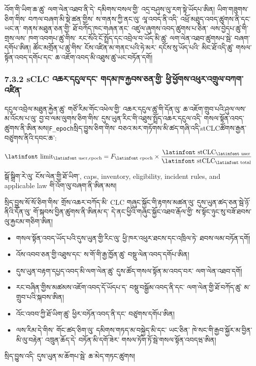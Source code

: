 \documentclass[11pt]{article}
\begin{document}
འོག་གི་ཡིག་ཆ་ཚུ་ ལག་ལེན་འཐབ་ནི་དེ་ དམིགས་བསལ་གྱི་ འདྲ་བཤུས་ལུ་རག་སྟེ་ཡོདཔ་ཨིན། ཡིག་གཟུགས་ཅིག་གིས་ བཀལ་བཞག་མི་སྡེ་ཚན་གྱིས་ ས་གནས་ཀྱི་ནང་ལུ་ ལཱ་འབད་ནི་འདི་ འཕྲོ་མཐུད་འབད་ཚུགས་ནི་དང་ ཡང་ན་ གནས་མཐུན་ཅན་གྱི་ ཐོ་བཀོད་ཁང་གཞན་ནང་ འཛུལ་ཞུགས་འབད་ཚུགས་པ་ཅིན་ ལས་བྱེདཔ་ཚུ་གི་གྲས་ལས་ ཁག་འབགཔ་ཚུ་གིས་ རང་སོའི་ངོ་སྤྲོད་དང་འབྲེལ་བ་ཡོད་མི་ཚུ་ ལག་ལེན་འཐབ་ཚུགསཔ་སྦེ་ བཞག་དགོཔ་ཨིན། ཚོང་མགྲོན་པ་ཚུ་གིས་ ངོས་འཛིན་མ་གནང་པའི་ཧེ་མར་ དངོས་སུ་ཡོད་པའི་ མིང་ཐོ་འདི་ཚུ་ གསལ་སྟོན་འབད་དགོཔ་དང་ ཆ་འཇོག་འབད་མི་འཐུས་ཚུ་ཡང་བཏོན་དགོ།

\subsubsection*{7.3.2 sCLC འཆར་དངུལ་དང་ གདམ་ཁ་རྐྱབས་ཅན་གྱི་ ཕྱི་ཕྱོགས་འཕུར་འགྲུལ་བཀག་འཛིན་}

དངུལ་འབྲེལ་མཐུན་རྐྱེན་ཚུ་ གཙོ་རིམ་གོང་འཕེལ་གྱི་ འཆར་དངུལ་ཚུ་གི་དོན་ལུ་ ཆ་འཇོག་གྲུབ་པའི་ཤུལ་ལས་ མ་འོངས་པ་ལུ་ བྱ་བ་ལམ་ལུགས་ཅིག་གིས་ དུས་ཡུན་རིང་གི་འཐུས་སྤྲོད་འཆར་དངུལ་འདི་ གསལ་སྟོན་འབད་ཚུགས་ནི་ཨིན་མས།\texttt{F\_epoch}སྲིད་བྱུས་ཅིག་གིས་ བཅའ་མར་གཏོགས་མི་ཚད་གཞི་འདི་stCLCཚོགས་རྒྱན་བཙུགས་ནིའི་དབང་ཆ་:

\[
\text{\latinfont limit}_{\text{\latinfont user,epoch}} = F_{\text{\latinfont epoch}} \times \frac{\text{\latinfont stCLC}_{\text{\latinfont user}}}{\text{\latinfont stCLC}_{\text{\latinfont total}}}
\]

སྒོ་སྒྲིག་རེ་ལུ་ ངོས་ལེན་གྱི་ཐོ་ཡིག་, caps, inventory, eligibility, incident rules, and applicable law གི་འོག་ལུ་བཞག་ནི་ཨིན་མས།

སྲིད་བྱུས་སོ་སོ་ཅིག་གིས་ གྲོས་འཆར་བཀོད་མི་ CLC གཞུང་སྐྱོང་གི་རྟགས་མཚན་ལུ་ དུས་ཡུན་ཚད་ཅན་སྦེ་ཉོ་ནིའི་དོན་ལུ་ གོ་སྐབས་བྱིན་ཚུགས་ནི་ཨིནམ་ད་ དེ་ནང་ཕྱིའི་གཞུང་སྐྱོང་འཐབ་རྒོལ་གྱི་ ས་སྟོང་ཉུང་སུ་བཟོ་ཐབས་ལུ་རྐྱངམ་གཅིག་ཨིན།

\begin{itemize}[leftmargin=*]
\item གསལ་སྟོན་འབད་ཡོད་པའི་དུས་ཡུན་གྱི་རིང་ལུ་ ཕྱི་ཁར་འཕུར་ཐངས་དང་འཁྲིལ་ཏེ་ ཐབས་ལམ་བཏོན་དགོ།
\item འོས་འབབ་ཅན་གྱི་འཐུས་དང་ ས་གོ་གི་རྒྱ་ཁྱོན་ཚུ་ བསྡུ་ལེན་འབད་དགོཔ་ཨིན།
\item དུས་ཡུན་བརྟག་དཔྱད་འབད་མི་ལག་ལེན་ཚུ་ དུས་ཚོད་གསལ་སྟོན་མ་འབད་བར་ ལག་ལེན་འཐབ་དགོ།
\item རང་བཞིན་གྱིས་མཚམས་འཇོག་འབད་དོ་ཡོདཔ་ད་ བསྡུ་བསྒྱོམ་འབད་ནི་དང་ ལག་ལེན་གྱི་ཐོ་བཀོད་ཚུ་ མ་གྲུབ་པའི་སྐབས་ཨིན།
\item འོང་འབབ་ཀྱི་ཐོ་ཡིག་ཚུ་ ཕྱིར་བཏོན་འབད་ནི་དང་ བཙུགས་དགོཔ་ཨིན།
\item ལས་རིམ་དེ་གིས་ གོང་ཚད་ཅིག་ལུ་ དམིགས་གཏད་མ་བསྐྱེད་མི་དང་ ཡང་ཅིན་ ཁེ་སང་གི་རྒྱབ་སྐྱོར་མ་བྱིན་མི་ལུ་བརྟེན་ འཁྲུན་ཆོད་དེ་ བཏོན་མི་དགོ་ཟེར་ གསལ་ཏོག་ཏོ་སྦེ་གསལ་སྟོན་འབདཝ་ཨིན།
\end{itemize}
སྲིད་བྱུས་འདི་ དུས་ཡུན་མ་ཆོགཔ་སྦེ་ ཆ་མེད་གཏང་ཚུགས།
\end{document}
